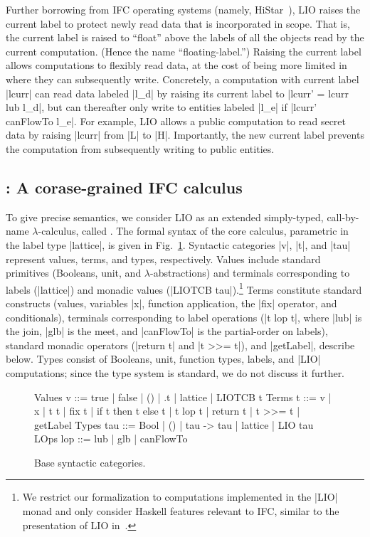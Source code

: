 Further borrowing from IFC operating systems (namely,
HiStar~\cite{zeldovich:histar}), LIO raises the current label to
protect newly read data that is incorporated in scope.
%
That is, the current label is raised to ``float'' above the labels of
all the objects read by the current computation.
(Hence the name ``floating-label.'')
% 
Raising the current label allows computations to flexibly read data,
at the cost of being more limited in where they can subsequently
write.
%
Concretely, a computation with current label |lcurr| can read data
labeled |l_d| by raising its current label to |lcurr' = lcurr lub
l_d|, but can thereafter only write to entities labeled |l_e| if
|lcurr' canFlowTo l_e|.
%
For example, LIO allows a public computation to read secret data by
raising |lcurr| from |L| to |H|. Importantly, the new current label
prevents the computation from subsequently writing to public entities.
 
\subsection{\lio: A corase-grained IFC calculus}
 
To give precise semantics, we consider LIO as an extended
simply-typed, call-by-name $\lambda$-calculus, called \lio.
%
The formal syntax of the core \lio{} calculus, parametric in the label
type |lattice|, is given in Fig.~\ref{fig:language:base}.
%
Syntactic categories |v|, |t|, and |tau| represent values, terms, and
types, respectively.
%
Values include standard primitives (Booleans, unit,
and $\lambda$-abstractions) and terminals corresponding to labels
(|lattice|) and monadic values (|LIOTCB tau|).\footnote{
We restrict our formalization to computations implemented in the |LIO|
monad and only consider Haskell features relevant to IFC, similar to
the presentation of LIO in~.
}
%
Terms constitute standard constructs (values, variables |x|, function
application, the |fix| operator, and conditionals), terminals
corresponding to label operations (|t lop t|, where |lub| is the join,
|glb| is the meet, and |canFlowTo| is the partial-order on labels),
standard monadic operators (|return t| and |t >>= t|), and |getLabel|,
describe below.
%
Types consist of Booleans, unit, function types, labels, and |LIO|
computations; since the \lio{} type system is standard, we do not
discuss it further.

\begin{figure}
\centering
\begin{code}
Values  v    ::=  true | false | () | \x.t | lattice | LIOTCB t
Terms   t    ::=  v | x | t t | fix t | if t then t else t
               |  t lop t | return t | t >>= t | getLabel
Types   tau  ::=  Bool | () | tau -> tau | lattice | LIO tau  
LOps    lop  ::=  lub | glb | canFlowTo
\end{code}
\caption{Base \lio{} syntactic categories.
\label{fig:language:base}}
\end{figure}

